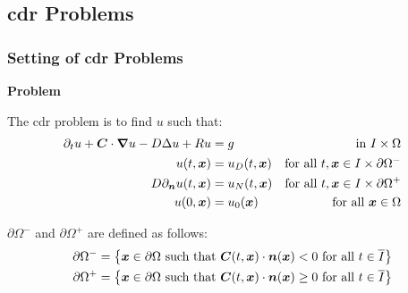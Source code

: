 \subsection{\texorpdfstring{\acrlong{cdr}}{} Problems}

\begin{frame}
    \frametitle{Setting of \acrshort{cdr} Problems}

    \vspace*{\fill}
    \begin{center}
        {\color{\accentcolor} \Large \textbf{Problem}}
        \vspace*{0.25cm}

        \begin{minipage}{0.75\textwidth}
            \begin{definition}
                The \acrshort{cdr} problem is to find $u$ such that:
                \begin{align*}
                    \partial_t u + \bm{C} \cdot \bm{\nabla} u - D \Delta u + R u &= g &\text{ in } I \times \Omega \\ 
                    u(t, \bm{x}) &= u_D(t, \bm{x}) &\text{for all } t, \bm{x} \in I \times \partial \Omega^- \\
                    D \partial_{\bm{n}} u(t, \bm{x}) &= u_N(t, \bm{x}) &\text{for all } t, \bm{x} \in I \times \partial \Omega^+ \\
                    u(0, \bm{x}) &= u_0(\bm{x}) &\text{for all } \bm{x} \in \Omega
                \end{align*}
            \end{definition}
        \end{minipage}
    \end{center}

    \vspace*{\fill}

    \begin{center}
        \begin{minipage}{0.75\textwidth}
            \begin{definition}
                $\partial \Omega^-$ and $\partial \Omega^+$ are defined as follows: 
                \begin{align*}
                    \partial \Omega^- = \left\{ \bm{x} \in \partial \Omega \text{ such that } \bm{C}(t, \bm{x}) \cdot \bm{n}(\bm{x}) < 0 \text{ for all } t \in \overline{I} \right\} \\
                    \partial \Omega^+ = \left\{ \bm{x} \in \partial \Omega \text{ such that } \bm{C}(t, \bm{x}) \cdot \bm{n}(\bm{x}) \geq 0 \text{ for all } t \in \overline{I} \right\}
                \end{align*}
            \end{definition}
        \end{minipage}
    \end{center}
    \vspace*{\fill}
    
\end{frame}

